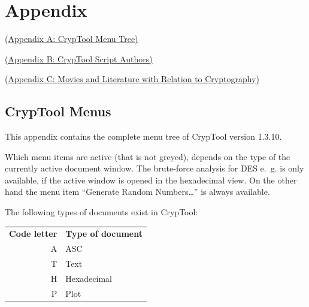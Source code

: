 
\newpage
\hypertarget{appendix-start}{}\label{s:appendix-start}


\section{Appendix}

\hyperlink{appendix-menutree}{(Appendix A: CrypTool Menu Tree)}

\hyperlink{appendix-authors}{(Appendix B: CrypTool Script Authors)}

\hyperlink{appendix-movies}{(Appendix C: Movies and Literature with Relation to Cryptography)} 



\newpage
\enlargethispage{1cm}
\subsection{CrypTool Menus}
\hypertarget{appendix-menutree}{}\label{s:appendix-menutree}

This appendix contains the complete menu tree of CrypTool version 1.3.10. 

Which menu items are active (that is not greyed), depends on the type 
of the currently active document window.
The brute-force analysis for DES e.~g. is only
available, if the active window is opened in the hexadecimal view. 
On the other hand the menu item
``Generate Random Numbers\dots'' is always available.

The following types of documents exist in CrypTool:
\begin{center}
\begin{tabular}{rl}
\bf Code letter & \bf Type of document \\
A & ASC\\
T & Text\\
H & Hexadecimal\\
P & Plot\\
\end{tabular}
\end{center}


